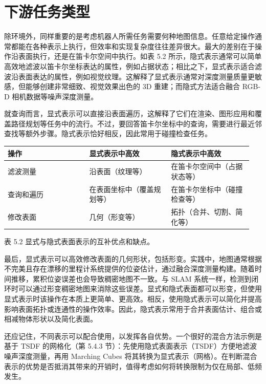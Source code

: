 \section{下游任务类型}

除环境外，同样重要的是考虑机器人所需任务需要何种地图信息。任意给定操作通常都能在各种表示上执行，但效率和实现复杂度往往差异很大。最大的差别在于操作沿表面执行，还是在笛卡尔空间中执行。如表 5.2 所示，隐式表示通常可以简单高效地滤波以笛卡尔坐标表达的属性，例如占据状态；相比之下，显式表示适合滤波沿表面表达的属性，例如视觉纹理。这解释了显式表示通常对深度测量质量更敏感，但能够创建非常细致、视觉效果出色的 3D 重建；而隐式方法适合融合 RGB-D 相机数据等噪声深度测量。

就查询而言，显式表示可以直接沿表面遍历，这解释了它们在渲染、图形应用和覆盖路径规划等任务中的流行。不过，要回答笛卡尔坐标中的查询，需要进行最近邻查找等额外步骤。隐式表示恰好相反，因此常用于碰撞检查任务。

\small
\setlength{\tabcolsep}{2pt}
\begin{center}
\begin{tabular}{p{0.317\linewidth}p{0.317\linewidth}p{0.317\linewidth}}
\toprule
操作 & 显式表示中高效 & 隐式表示中高效 \\
\midrule
滤波测量 & 沿表面（纹理等） & 在笛卡尔空间中（占据状态等） \\
查询和遍历 & 在表面坐标中（覆盖规划等） & 在笛卡尔坐标中（碰撞检查等） \\
修改表面 & 几何（形变等） & 拓扑（合并、切割、简化等） \\
\bottomrule
\end{tabular}
\end{center}

表 5.2 显式与隐式表面表示的互补优点和缺点。

最后，显式表示可以高效修改表面的几何形状，包括形变。实践中，地图通常根据不完美且存在漂移的里程计系统提供的位姿估计，通过融合深度测量构建。随着时间推移，累积位姿误差也会导致稠密地图不一致。与 SLAM 系统一样，检测到闭环时可以通过形变稠密地图来消除这些误差。显式和隐式表面都可以形变，但使用显式表示时该操作在本质上更简单、更高效。相反，使用隐式表示可以简化并提高影响表面拓扑或连通性的操作效率。因此，隐式表示常用于合并表面估计、组合或相减物体形状以及简化表面。

还应记住，不同表示可以配合使用，以发挥各自优势。一个很好的混合方法示例是基于 TSDF 的网格化（第 5.4.3 节）：先使用隐式表面表示（TSDF）方便地滤波噪声深度测量，再用 Marching Cubes 将其转换为显式表示（网格）。在判断混合表示的优势是否抵消其带来的开销时，值得考虑如何将转换限制为仅在局部、低频发生。

